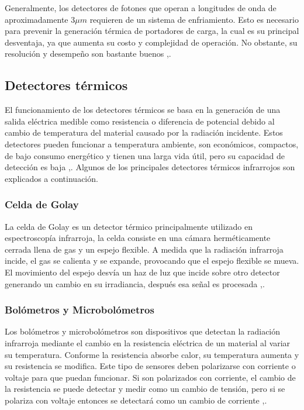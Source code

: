 Generalmente, los detectores de fotones que operan a longitudes de onda de aproximadamente 3$\mu m$ requieren de un sistema de enfriamiento. Esto es necesario para prevenir la generación térmica de portadores de carga, la cual es su principal desventaja, ya que aumenta su costo y complejidad de operación. No obstante, su resolución y desempeño son bastante buenos \cite{Vincent},\cite{BlancoMDA}. 
		   
		\subsection{Detectores térmicos}
		El funcionamiento de los detectores térmicos se basa en la generación de una salida eléctrica medible como resistencia o diferencia de potencial debido al cambio de temperatura del material causado por la radiación incidente.
Estos detectores pueden funcionar a temperatura ambiente, son económicos, compactos, de bajo consumo energético y tienen una larga vida útil, pero su capacidad de detección es baja \cite{Rogalski},\cite{BlancoMDA}.
Algunos de los principales detectores térmicos infrarrojos son explicados a continuación.
		
		\subsubsection{Celda de Golay}
		La celda de Golay es un detector térmico principalmente utilizado en espectroscopía infrarroja, la celda consiste en una cámara herméticamente cerrada llena de gas y un espejo flexible. A medida que la radiación infrarroja incide, el gas se calienta y se expande, provocando que el espejo flexible se mueva. El movimiento del espejo desvía un haz de luz que incide sobre otro detector generando un cambio en su irradiancia, después esa señal es procesada \cite{Vincent},\cite{BlancoMDA}.
		\subsubsection{Bolómetros y Microbolómetros}
		Los bolómetros y microbolómetros son dispositivos que detectan la radiación infrarroja mediante el cambio en la resistencia eléctrica de un material al variar su temperatura. Conforme la resistencia absorbe calor, su temperatura aumenta y su resistencia se modifica.
Este tipo de sensores deben polarizarse con corriente o voltaje para que puedan funcionar.
Si son polarizados con corriente, el cambio de la resistencia se puede detectar y medir como un cambio de tensión, pero si se polariza con voltaje entonces se detectará como un cambio de corriente \cite{Rogalski},\cite{Vincent}.
